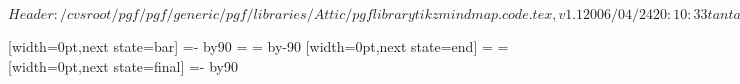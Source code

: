 \ProvidesPackageRCS[v\pgfversion] $Header: /cvsroot/pgf/pgf/generic/pgf/libraries/Attic/pgflibrarytikzmindmap.code.tex,v 1.1 2006/04/24 20:10:33 tantau Exp $

%




%

{
  [width=0pt,next state=bar]
  {
    {
    \pgftransformxshift{-1pt}%
    \pgftransformxshift{-\pgfsnakecirclestartradius}%
    \pgfpathmoveto{\pgfpointpolar{\pgfsnakesegmentangle}{\pgfsnakecirclestartradius}}
    \pgfpatharc{\pgfsnakesegmentangle}{-\pgfsnakesegmentangle}{\pgfsnakecirclestartradius}
    \@tempcnta=-\pgfsnakesegmentangle\relax
    \advance\@tempcnta by90\relax
    \@tempdima=\pgfsnakecirclestartradius\relax
    \pgfpathcurveto
    {\pgfpointadd
      {\pgfpointpolar{-\pgfsnakesegmentangle}{\pgfsnakecirclestartradius}}
      {}}
    {}
    {}
    \@tempcnta=\pgfsnakesegmentangle\relax
    \advance\@tempcnta by-90\relax
    \pgfpathcurveto
    {}
    {\pgfpointadd
      {\pgfpointpolar{\pgfsnakesegmentangle}{\pgfsnakecirclestartradius}}
      {}}
    {\pgfpointpolar{\pgfsnakesegmentangle}{\pgfsnakecirclestartradius}}
    \pgfpathclose
    }
  }
  [width=0pt,next state=end]
  {
    \@tempdima=\pgfsnakecirclestartradius\relax
    \@tempdimb=\pgfsnakecircleendradius\relax
    \pgfpathrectangle
    {}
    {}
  }
  [width=0pt,next state=final]
  {
    {
    \pgftransformxshift{\pgfsnakeremainingdistance}%
    \pgftransformxshift{1pt}%
    \pgftransformxshift{-\pgfsnakecircleendradius}%
    \pgfpathmoveto{\pgfpointpolar{\pgfsnakesegmentangle}{\pgfsnakecircleendradius}}
    \pgfpatharc{\pgfsnakesegmentangle}{-\pgfsnakesegmentangle}{\pgfsnakecircleendradius}
    \@tempcnta=-\pgfsnakesegmentangle\relax
    \advance\@tempcnta by90\relax
}}}
